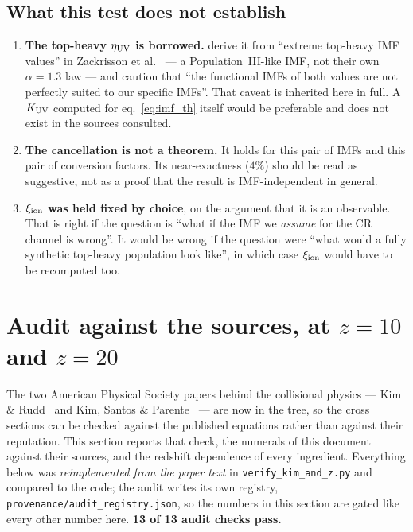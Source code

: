 \documentclass[11pt,a4paper]{article}
\begin{document}
\subsection{What this test does not establish}
\begin{enumerate}\itemsep2pt
\item \textbf{The top-heavy $\eta_{\rm UV}$ is borrowed.} \cite{jeong25} derive
      it from ``extreme top-heavy IMF values'' in Zackrisson et
      al.~\cite{zackrisson11} --- a Population~III-like IMF, not their own
      $\alpha=1.3$ law --- and caution that ``the functional IMFs of both values
      are not perfectly suited to our specific IMFs''. That caveat is inherited
      here in full. A $K_{\rm UV}$ computed for eq.~\eqref{eq:imf_th} itself
      would be preferable and does not exist in the sources consulted.
\item \textbf{The cancellation is not a theorem.} It holds for this pair of
      IMFs and this pair of conversion factors. Its near-exactness
      ($4\%$) should be read as suggestive, not as a proof that the result is
      IMF-independent in general.
\item \textbf{$\xi_{\rm ion}$ was held fixed by choice}, on the argument that it
      is an observable. That is right if the question is ``what if the IMF we
      \emph{assume} for the CR channel is wrong''. It would be wrong if the
      question were ``what would a fully synthetic top-heavy population look
      like'', in which case $\xi_{\rm ion}$ would have to be recomputed too.
\end{enumerate}


\clearpage
\section{Audit against the sources, at \texorpdfstring{$z=10$}{z=10} and
         \texorpdfstring{$z=20$}{z=20}}\label{sec:audit}
The two American Physical Society papers behind the collisional physics ---
Kim \& Rudd~\cite{kimrudd94} and Kim, Santos \& Parente~\cite{kim00} --- are now
in the tree, so the cross sections can be checked against the published
equations rather than against their reputation. This section reports that check,
the numerals of this document against their sources, and the redshift dependence
of every ingredient. Everything below was \emph{reimplemented from the paper
text} in \texttt{verify\_kim\_and\_z.py} and compared to the code; the audit
writes its own registry, \texttt{provenance/audit\_registry.json}, so the
numbers in this section are gated like every other number here.
\textbf{13 of 13 audit checks pass.}
\end{document}

